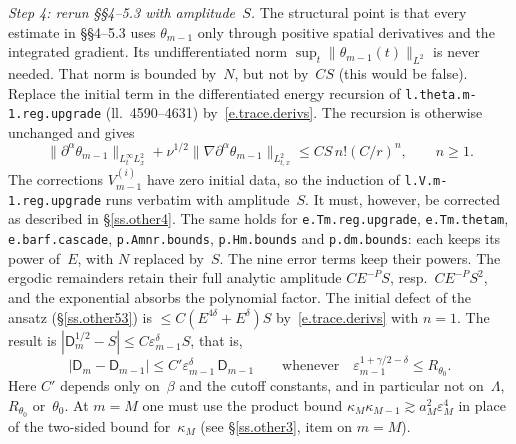 \documentclass[11pt]{amsart}
\newcommand{\ep}{\varepsilon}
\newcommand{\Lns}[1]{ll.~#1}
\newcommand{\lab}[1]{\texttt{#1}}
\theoremstyle{remark}
\begin{document}
\emph{Step 4: rerun \S\S4--5.3 with amplitude~$S$.} The structural point is that every estimate in \S\S4--5.3 uses $\theta_{m-1}$ only through positive spatial derivatives and the integrated gradient. Its undifferentiated norm $\sup_t\|\theta_{m-1}(t)\|_{L^2}$ is never needed. That norm is bounded by~$N$, but not by~$CS$ (this would be false). Replace the initial term in the differentiated energy recursion of \lab{l.theta.m-1.reg.upgrade} (\Lns{4590--4631}) by~\eqref{e.trace.derivs}. The recursion is otherwise unchanged and gives
\begin{equation*}
\|\partial^\alpha\theta_{m-1}\|_{L^\infty_tL^2_x}+\nu^{1/2}\|\nabla\partial^\alpha\theta_{m-1}\|_{L^2_{t,x}}\leq CS\,n!(C/r)^n ,\qquad n\geq1 .
\end{equation*}
The corrections $V^{(i)}_{m-1}$ have zero initial data, so the induction of \lab{l.V.m-1.reg.upgrade} runs verbatim with amplitude~$S$. It must, however, be corrected as described in \S\ref{ss.other4}. The same holds for \lab{e.Tm.reg.upgrade}, \lab{e.Tm.thetam}, \lab{e.barf.cascade}, \lab{p.Amnr.bounds}, \lab{p.Hm.bounds} and \lab{p.dm.bounds}: each keeps its power of~$E$, with $N$ replaced by~$S$. The nine error terms keep their powers. The ergodic remainders retain their full analytic amplitude $CE^{-P}S$, resp.\ $CE^{-P}S^2$, and the exponential absorbs the polynomial factor. The initial defect of the ansatz (\S\ref{ss.other53}) is $\leq C(E^{4\delta}+E^\delta)S$ by~\eqref{e.trace.derivs} with $n=1$. The result is $|\mathsf D_m^{1/2}-S|\leq C\ep_{m-1}^\delta S$, that is,
\begin{equation}
\label{e.relative}
|\mathsf D_m-\mathsf D_{m-1}|\leq C'\ep_{m-1}^\delta\,\mathsf D_{m-1}\qquad\text{whenever}\quad \ep_{m-1}^{1+\gamma/2-\delta}\leq R_{\theta_0}.
\end{equation}
Here $C'$ depends only on~$\beta$ and the cutoff constants, and in particular not on~$\Lambda$, $R_{\theta_0}$ or~$\theta_0$. At $m=M$ one must use the product bound $\kappa_M\kappa_{M-1}\gtrsim a_M^2\ep_M^4$ in place of the two-sided bound for~$\kappa_M$ (see \S\ref{ss.other3}, item on $m=M$).
\end{document}
